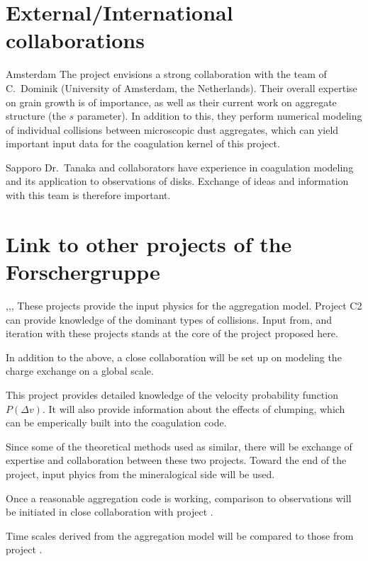 \section{External/International collaborations}
\begin{collablist}
\item[Amsterdam] The project envisions a strong collaboration with the team of C.~Dominik
(University of Amsterdam, the Netherlands). Their overall expertise on grain
growth is of importance, as well as their current work on aggregate structure
(the $s$ parameter). In addition to this, they perform numerical modeling
of individual collisions between microscopic dust aggregates, which can
yield important input data for the coagulation kernel of this project.
\item[Sapporo] Dr.\ Tanaka and collaborators have experience in coagulation
modeling and its application to observations of disks. Exchange of ideas and
information with this team is therefore important.
\end{collablist}



\section{Link to other projects of the Forschergruppe}
\begin{linkproj}
\item[\projblum{},\projwurm{},\projblumtrie{},\projkley] These projects
provide the input physics for the aggregation model. Project C2 can 
provide knowledge of the dominant types of collisions. Input from, and
iteration with these projects stands at the core of the project proposed
here.
\item[\projblum{}] In addition to the above, a close collaboration will
be set up on modeling the charge exchange on a global scale.
\item[\projklahr{}] This project provides detailed knowledge of
the velocity probability function $P(\Delta v)$. It will also
provide information about the effects of clumping, which can be 
emperically built into the coagulation code.
\item[\projtscharn{}] Since some of the theoretical
methods used as similar, there will be exchange of expertise and
collaboration between these two projects. Toward the end of the project,
input phyics from the mineralogical side will be used.
\item[\projwolf{}] Once a reasonable aggregation code is working, 
comparison to observations will be initiated in close collaboration
with project \projwolf{}.
\item[\projtrie{}] Time scales derived from the aggregation model will
be compared to those from project \projtrie{}.
\end{linkproj}



